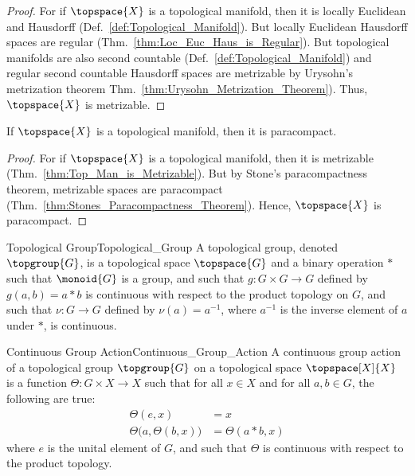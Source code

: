 \documentclass{article}                                                        %
\begin{document}
        \begin{proof}
            For if $\topspace{X}$ is a topological manifold, then it is locally
            Euclidean and Hausdorff (Def.~\ref{def:Topological_Manifold}). But
            locally Euclidean Hausdorff spaces are regular
            (Thm.~\ref{thm:Loc_Euc_Haus_is_Regular}). But topological manifolds
            are also second countable (Def.~\ref{def:Topological_Manifold}) and
            regular second countable Hausdorff spaces are metrizable by
            Urysohn's metrization theorem 
            Thm.~\ref{thm:Urysohn_Metrization_Theorem}). Thus, $\topspace{X}$ is
            metrizable.
        \end{proof}
        \begin{theorem}
            \label{thm:Top_Man_is_Paracompact}%
            If $\topspace{X}$ is a topological manifold, then it is paracompact.
        \end{theorem}
        \begin{proof}
            For if $\topspace{X}$ is a topological manifold, then it is
            metrizable (Thm.~\ref{thm:Top_Man_is_Metrizable}). But by Stone's
            paracompactness theorem, metrizable spaces are paracompact
            (Thm.~\ref{thm:Stones_Paracompactness_Theorem}). Hence,
            $\topspace{X}$ is paracompact.
        \end{proof}
        \begin{fdefinition}{Topological Group}{Topological_Group}
            A topological group, denoted $\topgroup{G}$, is a topological space
            $\topspace{G}$ and a binary operation $*$ such that $\monoid{G}$ is
            a group, and such that $g:G\times{G}\rightarrow{G}$ defined by
            $g(a,b)=a*b$ is continuous with respect to the product topology on
            $G$, and such that $\nu:G\rightarrow{G}$ defined by
            $\nu(a)=a^{\minus{1}}$, where $a^{\minus{1}}$ is the inverse element
            of $a$ under $*$, is continuous.
        \end{fdefinition}
        \begin{fdefinition}{Continuous Group Action}{Continuous_Group_Action}
            A continuous group action of a topological group $\topgroup{G}$
            on a topological space $\topspace[X]{X}$ is a function
            $\Theta:G\times{X}\rightarrow{X}$ such that for all $x\in{X}$ and
            for all $a,b\in{G}$, the following are true:
            \begin{align*}
                \Theta(e,x)&=x\\
                \Theta\big(a,\Theta(b,x)\big)&=\Theta(a*b,x)
            \end{align*}
            where $e$ is the unital element of $G$, and such that $\Theta$ is
            continuous with respect to the product topology.
        \end{fdefinition}
\end{document}
